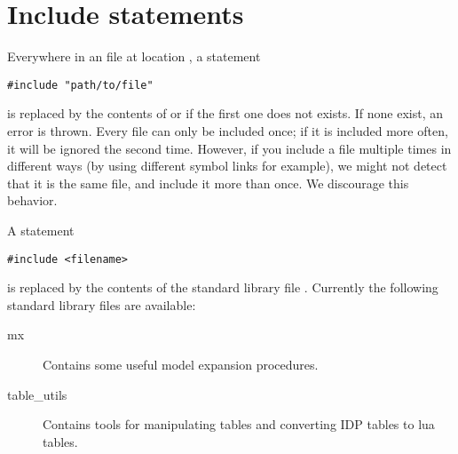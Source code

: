 \section{Include statements}
Everywhere in an \idp file at location , a statement 
\begin{lstlisting}
#include "path/to/file"
\end{lstlisting}
is replaced by the contents of  or  if the first one does not exists. 
If none exist, an error is thrown.
Every file can only be included once; if it is included more often, it will be ignored the second time.
However, if you include a file multiple times in different ways (by using different symbol links for example), we might not detect that it is the same file, and include it more than once.
We discourage this behavior.


A statement
\begin{lstlisting}
#include <filename>
\end{lstlisting}
is replaced by the contents of the standard library file .
Currently the following standard library files are available:
\begin{description}
\item[mx] Contains some useful model expansion procedures.
\item[table\_utils] Contains tools for manipulating tables and converting IDP tables to lua tables.
\end{description}
